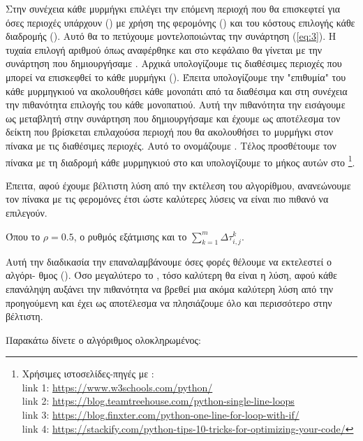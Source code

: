 Στην συνέχεια κάθε μυρμήγκι επιλέγει την επόμενη περιοχή που θα επισκεφτεί για όσες περιοχές υπάρχουν () με χρήση της φερομόνης () και του κόστους επιλογής κάθε διαδρομής (). Αυτό θα το πετύχουμε μοντελοποιώντας την συνάρτηση (\ref{eq:3}). Η τυχαία επιλογή αριθμού όπως αναφέρθηκε και στο κεφάλαιο  θα γίνεται με την συνάρτηση  που δημιουργήσαμε \cite{lipowski2012roulette}.
Αρχικά υπολογίζουμε τις διαθέσιμες περιοχές που μπορεί να επισκεφθεί το κάθε μυρμήγκι (). Έπειτα υπολογίζουμε την "επιθυμία" του κάθε μυρμηγκιού να ακολουθήσει κάθε μονοπάτι από τα διαθέσιμα και στη συνέχεια την πιθανότητα επιλογής του κάθε μονοπατιού. Αυτή την πιθανότητα την εισάγουμε ως μεταβλητή στην συνάρτηση  που δημιουργήσαμε και έχουμε ως αποτέλεσμα τον δείκτη που βρίσκεται επιλαχούσα περιοχή που θα ακολουθήσει το μυρμήγκι στον πίνακα με τις διαθέσιμες περιοχές. Αυτό το ονομάζουμε . Τέλος προσθέτουμε τον πίνακα με τη διαδρομή κάθε μυρμηγκιού στο  και υπολογίζουμε το μήκος αυτών στο \footnote{Xρήσιμες ιστοσελίδες-πηγές με : \\
link 1: \url{https://www.w3schools.com/python/}\\
link 2: \url{https://blog.teamtreehouse.com/python-single-line-loops} \\
link 3: \url{https://blog.finxter.com/python-one-line-for-loop-with-if/}\\
link 4: \url{https://stackify.com/python-tips-10-tricks-for-optimizing-your-code/}
}.


Έπειτα, αφού έχουμε βέλτιστη λύση από την εκτέλεση του αλγορίθμου, ανανεώνουμε τον πίνακα με τις φερομόνες έτσι ώστε καλύτερες λύσεις να είναι πιο πιθανό να επιλεγούν.

Όπου το $ρ=0.5$, ο ρυθμός εξάτμισης και  το $\sum_{k=1}^{m}{Δτ^k_{i,j}}$. 


Αυτή την διαδικασία την επαναλαμβάνουμε όσες φορές θέλουμε να εκτελεστεί ο αλγόρι- θμος (). Όσο μεγαλύτερο το , τόσο καλύτερη θα είναι η λύση, αφού κάθε επανάληψη αυξάνει την πιθανότητα να βρεθεί μια ακόμα καλύτερη λύση από την προηγούμενη και έχει ως αποτέλεσμα να πλησιάζουμε όλο και περισσότερο στην βέλτιστη.

Παρακάτω δίνετε ο αλγόριθμος ολοκληρωμένος:


